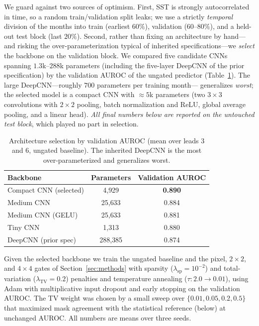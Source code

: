 \documentclass[12pt]{article}
\begin{document}
We guard against two sources of optimism. First, SST is strongly autocorrelated in time, so a
random train/validation split leaks; we use a strictly \emph{temporal} division of the months
into train (earliest $60\%$), validation ($60$--$80\%$), and a held-out test block (last $20\%$).
Second, rather than fixing an architecture by hand---and risking the over-parameterization typical
of inherited specifications---we \emph{select} the backbone on the validation block. We compared
five candidate CNNs spanning $1.3$k--$288$k parameters (including the five-layer DeepCNN of the
prior specification) by the validation AUROC of the ungated predictor
(Table~\ref{tab:enso-select}). The large DeepCNN---roughly $700$ parameters per training month---
generalizes \emph{worst}; the selected model is a compact CNN with $\approx\!5$k parameters (two
$3\times3$ convolutions with $2\times2$ pooling, batch normalization and ReLU, global average
pooling, and a linear head). \emph{All final numbers below are reported on the untouched test
block}, which played no part in selection.

\begin{table}[htbp]
\centering
\caption{Architecture selection by validation AUROC (mean over leads 3 and 6, ungated baseline).
  The inherited DeepCNN is the most over-parameterized and generalizes worst.}
\label{tab:enso-select}
\begin{tabular}{lcc}
\toprule
\textbf{Backbone} & \textbf{Parameters} & \textbf{Validation AUROC} \\
\midrule
Compact CNN (selected) & 4{,}929   & \textbf{0.890} \\
Medium CNN             & 25{,}633  & 0.884 \\
Medium CNN (GELU)      & 25{,}633  & 0.881 \\
Tiny CNN               & 1{,}313   & 0.880 \\
DeepCNN (prior spec)   & 288{,}385 & 0.874 \\
\bottomrule
\end{tabular}
\end{table}

Given the selected backbone we train the ungated baseline and the pixel, $2\times2$, and
$4\times4$ gates of Section~\ref{sec:methods} with sparsity ($\lambda_{\mathrm{sp}}=10^{-2}$) and
total-variation ($\lambda_{\mathrm{TV}}=0.2$) penalties and temperature annealing
($\tau:2.0\!\to\!0.01$), using Adam with multiplicative input dropout and early stopping on the
validation AUROC. The TV weight was chosen by a small sweep over $\{0.01,0.05,0.2,0.5\}$ that
maximized mask agreement with the statistical reference (below) at unchanged AUROC. All numbers
are means over three seeds.
\end{document}
